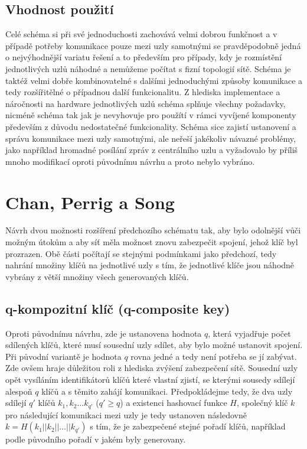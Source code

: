 \documentclass[11pt,final,twoside]{fithesis2}
\begin{document}
\subsection{Vhodnost použití}
Celé schéma si při své jednoduchosti zachovává velmi dobrou funkčnost a v případě potřeby komunikace pouze mezi uzly samotnými se pravděpodobně jedná o nejvýhodnější
variatu řešení a to především pro případy, kdy je rozmístění jednotlivých uzlů náhodné a nemůžeme počítat s fizní topologií sítě. Schéma je taktéž velmi dobře kombinovatelné
s dalšími jednoduchými způsoby komunikace a tedy rozšířitělné o případnou další funkcionalitu. Z hlediska implementace a náročnosti na hardware jednotlivých uzlů schéma
splňuje všechny požadavky, nicméně schéma tak jak je nevyhovuje pro použítí v rámci vyvíjené komponenty především z důvodu nedostatečné funkcionality. Schéma sice zajistí ustanovení
a správu komunikace mezi uzly samotnými, ale neřeší jakékoliv návazné problémy, jako například hromadné posílání zpráv z centrálního uzlu a vyžadovalo by příliš mnoho modifikací oproti 
původnímu návrhu a proto nebylo vybráno.

\section{Chan, Perrig a Song}
Návrh dvou možnosti rozšíření \cite{Perrig2003} předchozího schématu \cite{Eschenauer2002} tak, aby bylo odolnější vůči možným útokům a aby síť měla možnost znovu zabezpečit spojení, jehož
klíč byl prozrazen. Obě části počítají se stejnými podmínkami jako předchozí, tedy nahrání množiny klíčů na jednotlivé uzly s tím, že jednotlivé klíče jsou náhodně vybrány 
z větší množiny všech generovaných klíčů.

\subsection{q-kompozitní klíč (q-composite key)}
Oproti původnímu návrhu, zde je ustanovena hodnota $q$, která vyjadřuje počet sdílených klíčů, které musí sousední uzly sdílet, aby bylo možné ustanovit spojení. Při původní variantě 
je hodnota $q$ rovna jedné a tedy není potřeba se jí zabývat. Zde ovšem hraje důležitou roli z hlediska zvýšení zabezpečení sítě. Sousední uzly opět vysíláním identifikátorů klíčů které vlastní
zjistí, se kterými sousedy sdílejí alespoň $q$ klíčů a s těmito zahájí komunikaci. Předpokládejme tedy, že dva uzly sdílejí $q'$ klíčů $k_1, k_2 \dots k_{q'}$ ($q' \ge q$) a existenci hashovací funkce $H$, 
společný klíč $k$ pro následující komunikaci mezi uzly je tedy ustanoven následovně $k=H(k_1 || k_2 || \dots || k_{q'})$ s tím, že je zabezpečené stejné pořadí klíčů, například podle původního
pořadí v jakém byly generovany. 
\end{document}
